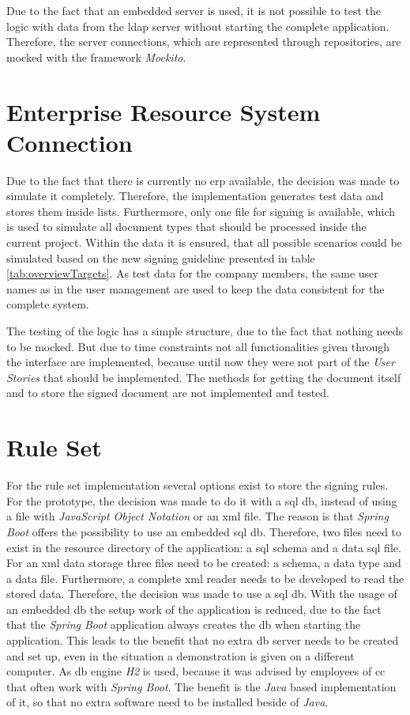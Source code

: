 Due to the fact that an embedded server is used, it is not possible to test the logic with data from the \gls{ldap} server without starting the complete application. Therefore, the server connections, which are represented through repositories, are mocked with the framework \textit{Mockito}.

\section{Enterprise Resource System Connection}
Due to the fact that there is currently no \gls{erp} available, the decision was made to simulate it completely. Therefore, the implementation generates test data and stores them inside lists. Furthermore, only one file for signing is available, which is used to simulate all document types that should be processed inside the current project. Within the data it is ensured, that all possible scenarios could be simulated based on the new signing guideline presented in table \ref{tab:overviewTargets}. \newline
As test data for the company members, the same user names as in the user management are used to keep the data consistent for the complete system.

The testing of the logic has a simple structure, due to the fact that nothing needs to be mocked. But due to time constraints not all functionalities given through the interface are implemented, because until now they were not part of the \textit{User Stories} that should be implemented. The methods for getting the document itself and to store the signed document are not implemented and tested.


\section{Rule Set}
For the rule set implementation several options exist to store the signing rules. For the prototype, the decision was made to do it with a \gls{sql} \gls{db}, instead of using a file with \textit{JavaScript Object Notation} or an \gls{xml} file. The reason is that \textit{Spring Boot} offers the possibility to use an embedded \gls{sql} \gls{db}. Therefore, two files need to exist in the resource directory of the application: a \gls{sql} schema and a data \gls{sql} file. For an \gls{xml} data storage three files need to be created: a schema, a data type and a data file. Furthermore, a complete \gls{xml} reader needs to be developed to read the stored data. Therefore, the decision was made to use a \gls{sql} \gls{db}. \newline
With the usage of an embedded \gls{db} the setup work of the application is reduced, due to the fact that the \textit{Spring Boot} application always creates the \gls{db} when starting the application. This leads to the benefit that no extra \gls{db} server needs to be created and set up, even in the situation a demonstration is given on a different computer. \newline
As \gls{db} engine \textit{H2} is used, because it was advised by employees of \gls{cc} that often work with \textit{Spring Boot}. The benefit is the \textit{Java} based implementation of it, so that no extra software need to be installed beside of \textit{Java}.


